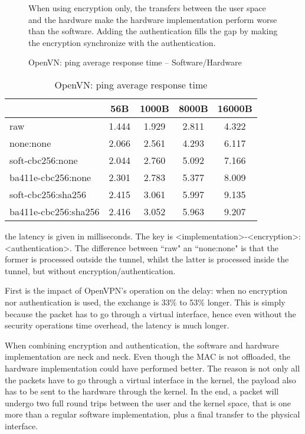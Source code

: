 \begin{figure}[ht]

\caption{OpenVN: ping average response time -- Software/Hardware}{When using encryption only, the transfers between the user space and the hardware make the hardware implementation perform worse than the software. Adding the authentication fills the gap by making the encryption synchronize with the authentication.}
\label{fig:ping-benchmark-openvpn}
\end{figure}

\begin{table}[ht]
\center
\small
\begin{tabular}{l|c|c|c|c|} \cline{2-5}
 & 56B & 1000B & 8000B & 16000B \\ \hline
\multicolumn{1}{|l|}{raw} & 1.444 & 1.929 & 2.811 & 4.322 \\ \hline
\multicolumn{1}{|l|}{none:none} & 2.066 & 2.561 & 4.293 & 6.117 \\ \hline
\multicolumn{1}{|l|}{soft-cbc256:none} & 2.044 & 2.760 & 5.092 & 7.166\\ \hline
\multicolumn{1}{|l|}{ba411e-cbc256:none} & 2.301 & 2.783 & 5.377 & 8.009\\ \hline
\multicolumn{1}{|l|}{soft-cbc256:sha256} & 2.415 & 3.061 & 5.997 & 9.135 \\ \hline
\multicolumn{1}{|l|}{ba411e-cbc256:sha256} & 2.416 & 3.052 & 5.963 & 9.207 \\ \hline
\end{tabular}
\caption{OpenVN: ping average response time}{the latency is given in milliseconds. The key is <implementation>-<encryption>:<authentication>. The difference between ``raw" an ``none:none" is that the former is processed outside the tunnel, whilst the latter is processed inside the tunnel, but without encryption/authentication.}
\label{tab:ping-benchmark-openvpn}
\end{table}

First is the impact of OpenVPN's operation on the delay: when no encryption nor authentication is used, the exchange is 33\% to 53\% longer. This is simply because the packet has to go through a virtual interface, hence even without the security operations time overhead, the latency is much longer.

When combining encryption and authentication, the software and hardware implementation are neck and neck.
Even though the MAC is not offloaded, the hardware implementation could have performed better.
The reason is not only all the packets have to go through a virtual interface in the kernel, the payload also has to be sent to the hardware through the kernel.
In the end, a packet will undergo two full round trips between the user and the kernel space, that is one more than a regular software implementation, plus a final transfer to the physical interface.

